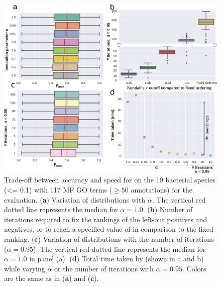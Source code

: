 \begin{figure}[H]
    \centering
    \includegraphics[width=\textwidth]{supp-figs/fig1-2018_06-seq-sim-e0_1-expc-rem-neg-comp-iea-50-1000-mf-a0_95.pdf}
    \caption{Trade-off between accuracy and speed for \sinksource on the 19 bacterial species \SSN (\eval <= 0.1) with 117 MF GO terms ($\ge 50$ annotations) for the \loso evaluation. 
      (\textbf{a}) Variation of \fmax distributions with $\alpha$. The vertical red dotted line represents the median \fmax for $\alpha = 1.0$.
      (\textbf{b}) Number of iterations required to fix the rankings of the left-out positives and negatives, or to reach a specified value of \ktau in comparison to the fixed ranking.
      (\textbf{c}) Variation of \fmax distributions with the number of iterations ($\alpha=0.95$). The vertical red dotted line represents the median \fmax for $\alpha = 1.0$ in panel (a).
      (\textbf{d}) Total time taken by \sinksource (shown in a and b) while varying $\alpha$ or the number of iterations with $\alpha=0.95$. Colors are the same as in (\textbf{a}) and (\textbf{c}).
    }
    \label{fig:sinksource-speed-vs-accuracy-mf}
\end{figure}


